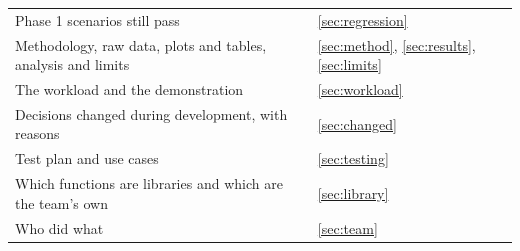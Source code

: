 \begin{table}[!htb]
\begin{tabularx}{\linewidth}{@{}Lp{2.6cm}@{}}
Phase 1 scenarios still pass & \ref{sec:regression} \\
Methodology, raw data, plots and tables, analysis and limits & \ref{sec:method}, \ref{sec:results}, \ref{sec:limits} \\
The workload and the demonstration & \ref{sec:workload} \\
Decisions changed during development, with reasons & \ref{sec:changed} \\
Test plan and use cases & \ref{sec:testing} \\
Which functions are libraries and which are the team's own & \ref{sec:library} \\
Who did what & \ref{sec:team} \\
\bottomrule
\end{tabularx}
\end{table}
